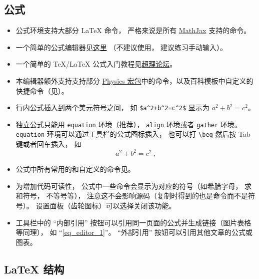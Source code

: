 \subsection{公式}
\begin{itemize}
\item 公式环境支持大部分 LaTeX 命令， 严格来说是所有 \href{https://www.mathjax.org/}{MathJax} 支持的命令。
\item 一个简单的公式编辑器见\href{https://www.codecogs.com/latex/eqneditor.php}{这里} （不建议使用， 建议练习手动输入）。
\item 一个简单的 TeX/LaTeX 公式入门教程见\href{https://chaoli.club/index.php/211}{超理论坛}。
\item 本编辑器额外支持支持部分 \href{http://mirrors.ibiblio.org/CTAN/macros/latex/contrib/physics/physics.pdf}{Physics 宏包}中的命令，以及百科模板中自定义的快捷命令（见）。
\item 行内公式插入到两个美元符号之间， 如 \verb|$a^2+b^2=c^2$| 显示为 $a^2 + b^2 = c^2$。
\item 独立公式只能用 \verb|equation| 环境（推荐）， \verb|align| 环境或者 \verb|gather| 环境。 \verb|equation| 环境可以通过工具栏的公式图标插入， 也可以打 \verb|\beq| 然后按 Tab 键或者回车插入， 如
\begin{equation}\label{eq_editor_1}
a^2 + b^2 = c^2~,
\end{equation}
\item 公式中所有常用的和自定义的命令见。
\item 为增加代码可读性， 公式中一些命令会显示为对应的符号（如希腊字母， 求和符号， 不等号等）， 注意这不会影响源码（复制时得到的也是命令而不是符号）。 设置面板（齿轮图标）可以选择关闭该功能。
\item 工具栏中的 “内部引用” 按钮可以引用同一页面的公式并生成链接（图片表格等同理）， 如 “\autoref{eq_editor_1}”。 “外部引用” 按钮可以引用其他文章的公式或图表。
\end{itemize}

\subsection{LaTeX 结构}

